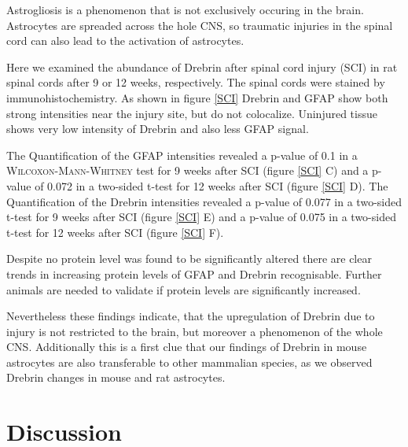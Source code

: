 \documentclass[a4paper,11pt,bibtotocnumbered]{article}
\begin{document}
Astrogliosis is a phenomenon that is not exclusively occuring in the brain. Astrocytes are spreaded across the hole CNS, so traumatic injuries in the spinal cord can also lead to the activation of astrocytes. 

Here we examined the abundance of Drebrin after spinal cord injury (SCI) in rat spinal cords after 9 or 12 weeks, respectively. The spinal cords were stained by immunohistochemistry. As shown in figure \ref{SCI} Drebrin and GFAP show both strong intensities near the injury site, but do not colocalize. Uninjured tissue shows very low intensity of Drebrin and also less GFAP signal. 

The Quantification of the GFAP intensities revealed a p-value of 0.1 in a \textsc{Wilcoxon-Mann-Whitney} test for 9 weeks after SCI (figure \ref{SCI} C) and a p-value of 0.072 in a two-sided t-test for 12 weeks after SCI (figure \ref{SCI} D). The Quantification of the  Drebrin intensities revealed a p-value of 0.077 in a two-sided t-test for 9 weeks after SCI (figure \ref{SCI} E) and a p-value of 0.075 in a two-sided t-test for 12 weeks after SCI (figure \ref{SCI} F). 

Despite no protein level was found to be significantly altered there are clear trends in increasing protein levels of GFAP and Drebrin recognisable. Further animals are needed to validate if protein levels are significantly increased.

Nevertheless these findings indicate, that the upregulation of Drebrin due to injury is not restricted to the brain, but moreover a phenomenon of the whole CNS. Additionally this is a first clue that our findings of Drebrin in mouse astrocytes are also transferable to other mammalian species, as we observed Drebrin changes in mouse and rat astrocytes. 



\newpage
\section{Discussion}
\end{document}
